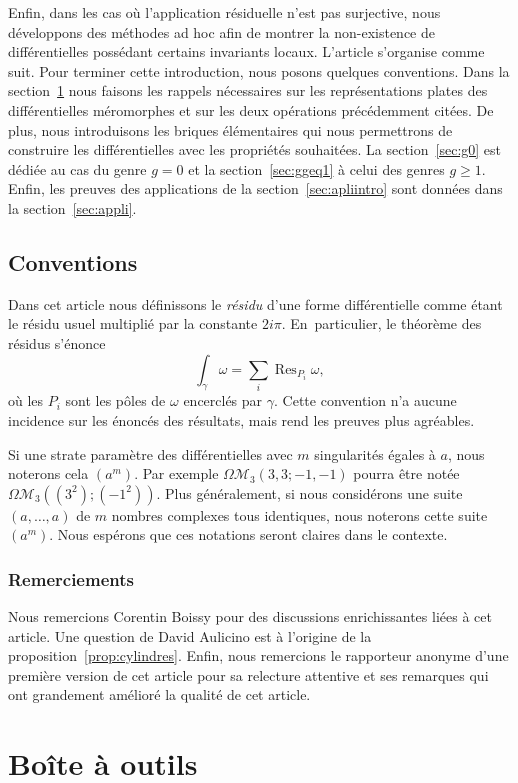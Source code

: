 \documentclass[JEP,XML,SOM,Unicode,francais,NoFloatCountersInSection,published]{cedram}
\let\mathcal\mathscr
\newcommand\Res{\operatorname{Res}}
\newcommand{\omoduli}[1][g]{{\Omega\mathcal M}_{\!#1}}
\theoremstyle{definition}
\begin{document}
Enfin, dans les cas où l'application résiduelle n'est pas surjective, nous développons des méthodes ad hoc afin de montrer la non-existence de différentielles possédant certains invariants locaux.
L'article s'organise comme suit. Pour terminer cette introduction, nous posons quelques conventions. Dans la section~\ref{sec:bao} nous faisons les rappels nécessaires sur les représentations plates des différentielles méromorphes et sur les deux opérations précédemment citées. De plus, nous introduisons les briques élémentaires qui nous permettrons de construire les différentielles avec les propriétés souhaitées. La section~\ref{sec:g0} est dédiée au cas du genre $g=0$ et la section~\ref{sec:ggeq1} à celui des genres $g\geq1$. Enfin, les preuves des applications de la section~\ref{sec:apliintro} sont données dans la section~\ref{sec:appli}.

\subsection{Conventions}
Dans cet article nous définissons le \emph{résidu} d'une forme différentielle comme étant le résidu usuel multiplié par la constante $2i\pi$. En~particulier, le théorème des résidus s'énonce
\[\int_{\gamma}\omega=\sum_{i} \Res_{P_{i}}\omega ,\]
où les $P_{i}$ sont les pôles de $\omega$ encerclés par $\gamma$. Cette convention n'a aucune incidence sur les énoncés des résultats, mais rend les preuves plus agréables.

Si une strate paramètre des différentielles avec $m$ singularités égales à $a$, nous noterons cela $(a^{m})$. Par exemple $\omoduli[3](3,3;-1,-1)$ pourra être notée $\omoduli[3]((3^{2});(-1^{2}))$. Plus généralement, si nous considérons une suite $(a,\dots,a)$ de $m$ nombres complexes tous identiques, nous noterons cette suite $(a^{m})$. Nous espérons que ces notations seront claires dans le contexte.

\subsubsection*{Remerciements}
Nous remercions Corentin Boissy pour des discussions enrichissantes liées à cet article. Une question de David Aulicino est à l'origine de la proposition~\ref{prop:cylindres}. Enfin, nous remercions le rapporteur anonyme d'une première version de cet article pour sa relecture attentive et ses remarques qui ont grandement amélioré la qualité de cet article.

\section{Boîte à outils}
\label{sec:bao}
\end{document}
